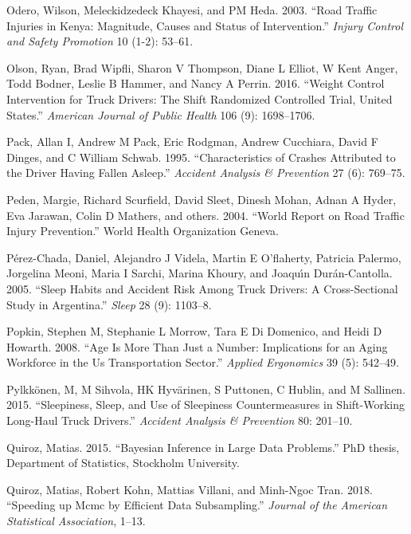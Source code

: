 \documentclass[12pt]{book}
\numberwithin{equation}{chapter}
\begin{document}
\leavevmode\hypertarget{ref-odero2003road}{}%
Odero, Wilson, Meleckidzedeck Khayesi, and PM Heda. 2003. ``Road Traffic Injuries in Kenya: Magnitude, Causes and Status of Intervention.'' \emph{Injury Control and Safety Promotion} 10 (1-2): 53--61.

\leavevmode\hypertarget{ref-olson2016weight}{}%
Olson, Ryan, Brad Wipfli, Sharon V Thompson, Diane L Elliot, W Kent Anger, Todd Bodner, Leslie B Hammer, and Nancy A Perrin. 2016. ``Weight Control Intervention for Truck Drivers: The Shift Randomized Controlled Trial, United States.'' \emph{American Journal of Public Health} 106 (9): 1698--1706.

\leavevmode\hypertarget{ref-pack1995characteristics}{}%
Pack, Allan I, Andrew M Pack, Eric Rodgman, Andrew Cucchiara, David F Dinges, and C William Schwab. 1995. ``Characteristics of Crashes Attributed to the Driver Having Fallen Asleep.'' \emph{Accident Analysis \& Prevention} 27 (6): 769--75.

\leavevmode\hypertarget{ref-peden2004world}{}%
Peden, Margie, Richard Scurfield, David Sleet, Dinesh Mohan, Adnan A Hyder, Eva Jarawan, Colin D Mathers, and others. 2004. ``World Report on Road Traffic Injury Prevention.'' World Health Organization Geneva.

\leavevmode\hypertarget{ref-perez2005sleep}{}%
Pérez-Chada, Daniel, Alejandro J Videla, Martin E O'flaherty, Patricia Palermo, Jorgelina Meoni, Maria I Sarchi, Marina Khoury, and Joaquı́n Durán-Cantolla. 2005. ``Sleep Habits and Accident Risk Among Truck Drivers: A Cross-Sectional Study in Argentina.'' \emph{Sleep} 28 (9): 1103--8.

\leavevmode\hypertarget{ref-popkin2008age}{}%
Popkin, Stephen M, Stephanie L Morrow, Tara E Di Domenico, and Heidi D Howarth. 2008. ``Age Is More Than Just a Number: Implications for an Aging Workforce in the Us Transportation Sector.'' \emph{Applied Ergonomics} 39 (5): 542--49.

\leavevmode\hypertarget{ref-pylkkonen2015sleepiness}{}%
Pylkkönen, M, M Sihvola, HK Hyvärinen, S Puttonen, C Hublin, and M Sallinen. 2015. ``Sleepiness, Sleep, and Use of Sleepiness Countermeasures in Shift-Working Long-Haul Truck Drivers.'' \emph{Accident Analysis \& Prevention} 80: 201--10.

\leavevmode\hypertarget{ref-quiroz2015bayesian}{}%
Quiroz, Matias. 2015. ``Bayesian Inference in Large Data Problems.'' PhD thesis, Department of Statistics, Stockholm University.

\leavevmode\hypertarget{ref-quiroz2018speeding1}{}%
Quiroz, Matias, Robert Kohn, Mattias Villani, and Minh-Ngoc Tran. 2018. ``Speeding up Mcmc by Efficient Data Subsampling.'' \emph{Journal of the American Statistical Association}, 1--13.
\end{document}
